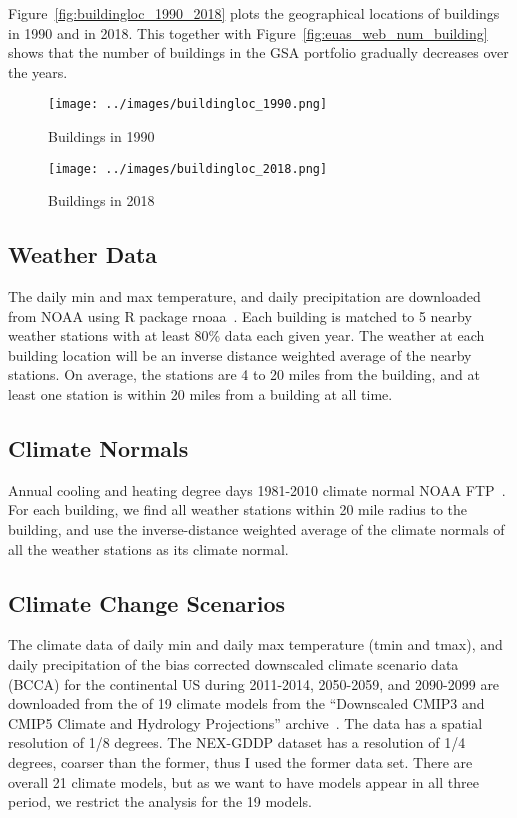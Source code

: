 \documentclass[12pt]{article}
\newcommand{\fref}[1]{Figure~\ref{#1}}
\begin{document}
\fref{fig:buildingloc_1990_2018} plots the geographical locations of buildings
in 1990 and in 2018. This together with \fref{fig:euas_web_num_building} shows
that the number of buildings in the GSA portfolio gradually decreases over the
years.

\begin{figure*}[t!]
    \centering
    \begin{subfigure}[t]{0.7\textwidth}
        \centering
        \texttt{[image: ../images/buildingloc\_1990.png]}
        \caption{Buildings in 1990}
    \end{subfigure}
    \begin{subfigure}[t]{0.7\textwidth}
        \centering
        \texttt{[image: ../images/buildingloc\_2018.png]}
        \caption{Buildings in 2018}
    \end{subfigure}
    \caption{Buildings in 1990 and 2018}
    \label{fig:buildingloc_1990_2018}
\end{figure*}

\subsection{Weather Data}
The daily min and max temperature, and daily precipitation are downloaded from
NOAA using R package rnoaa~\cite{rnoaa2017}. Each building is matched to 5
nearby weather stations with at least 80\% data each given year. The weather at
each building location will be an inverse distance weighted average of the
nearby stations. On average, the stations are 4 to 20 miles from the building,
and at least one station is within 20 miles from a building at all time.

\subsection{Climate Normals}
Annual cooling and heating degree days 1981-2010 climate normal NOAA
FTP~\cite{NOAAclimateNormal2020}. For each building, we find all weather
stations within 20 mile radius to the building, and use the inverse-distance
weighted average of the climate normals of all the weather stations as its
climate normal.

\subsection{Climate Change Scenarios}
The climate data of daily min and daily max temperature (tmin and tmax), and
daily precipitation of the bias corrected downscaled climate scenario data
(BCCA) for the continental US during 2011-2014, 2050-2059, and 2090-2099 are
downloaded from the of 19 climate models from the ``Downscaled CMIP3 and CMIP5
Climate and Hydrology Projections'' archive~\cite{Reclamation2013}. The data has
a spatial resolution of 1/8 degrees. The NEX-GDDP dataset has a resolution of
1/4 degrees, coarser than the former, thus I used the former data set. There are
overall 21 climate models, but as we want to have models appear in all three
period, we restrict the analysis for the 19 models.
\end{document}
